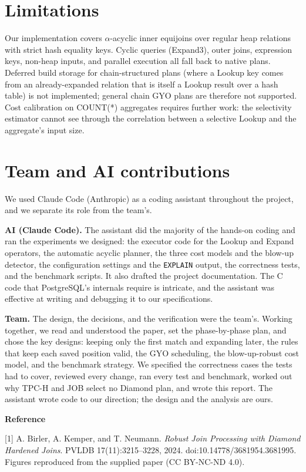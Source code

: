 \documentclass[10pt,twocolumn]{article}
\newcommand{\code}[1]{{\small\texttt{#1}}}
\begin{document}
\section{Limitations}

Our implementation covers $\alpha$-acyclic inner equijoins over regular heap
relations with strict hash equality keys. Cyclic queries (Expand3), outer
joins, expression keys, non-heap inputs, and parallel execution all fall back
to native plans. Deferred build storage for chain-structured plans (where a
Lookup key comes from an already-expanded relation that is itself a Lookup
result over a hash table) is not implemented; general chain GYO plans are
therefore not supported. Cost calibration on COUNT(*) aggregates requires
further work: the selectivity estimator cannot see through the correlation
between a selective Lookup and the aggregate's input size.

\section{Team and AI contributions}

We used Claude Code (Anthropic) as a coding assistant throughout the project,
and we separate its role from the team's.

\textbf{AI (Claude Code).} The assistant did the majority of the hands-on
coding and ran the experiments we designed: the executor code for the Lookup and
Expand operators, the automatic acyclic planner, the three cost models and the
blow-up detector, the configuration settings and the \code{EXPLAIN} output, the
correctness tests, and the benchmark scripts. It also drafted the project
documentation. The C code that PostgreSQL's internals require is intricate, and
the assistant was effective at writing and debugging it to our specifications.

\textbf{Team.} The design, the decisions, and the verification were the team's.
Working together, we read and understood the paper, set the phase-by-phase plan,
and chose the key designs: keeping only the first match and expanding later, the
rules that keep each saved position valid, the GYO scheduling, the blow-up-robust
cost model, and the benchmark strategy. We specified the correctness cases the
tests had to cover, reviewed every change, ran every test and benchmark, worked
out why TPC-H and JOB select no Diamond plan, and wrote this report. The
assistant wrote code to our direction; the design and the analysis are ours.

\vspace{4pt}
\noindent\small\textbf{Reference}\par
\noindent\small [1] A. Birler, A. Kemper, and T. Neumann.
\emph{Robust Join Processing with Diamond Hardened Joins}.
PVLDB 17(11):3215--3228, 2024. doi:10.14778/3681954.3681995.
Figures reproduced from the supplied paper (CC BY-NC-ND 4.0).
\end{document}
